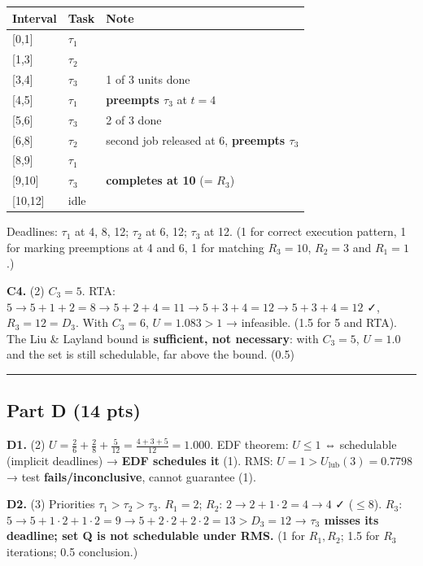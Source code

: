 \documentclass[
  11pt,
]{article}
\newcounter{none} %
\begin{document}
{\def\LTcaptype{none} %
\begin{longtable}[]{@{}lll@{}}
\toprule\noalign{}
Interval & Task & Note \\
\midrule\noalign{}
\endhead
\bottomrule\noalign{}
\endlastfoot
{[}0,1{]} & \(\tau_1\) & \\
{[}1,3{]} & \(\tau_2\) & \\
{[}3,4{]} & \(\tau_3\) & 1 of 3 units done \\
{[}4,5{]} & \(\tau_1\) & \textbf{preempts \(\tau_3\)} at \(t=4\) \\
{[}5,6{]} & \(\tau_3\) & 2 of 3 done \\
{[}6,8{]} & \(\tau_2\) & second job released at 6, \textbf{preempts
\(\tau_3\)} \\
{[}8,9{]} & \(\tau_1\) & \\
{[}9,10{]} & \(\tau_3\) & \textbf{completes at 10} (= \(R_3\)) \\
{[}10,12{]} & idle & \\
\end{longtable}
}

Deadlines: \(\tau_1\) at 4, 8, 12; \(\tau_2\) at 6, 12; \(\tau_3\) at
12. (1 for correct execution pattern, 1 for marking preemptions at 4 and
6, 1 for matching \(R_3 = 10\), \(R_2 = 3\) and \(R_1 = 1\).)

\textbf{C4.} (2) \(C_3 = 5\). RTA:
\(5 \to 5 + 1 + 2 = 8 \to 5 + 2 + 4 = 11 \to 5 + 3 + 4 = 12 \to 5 + 3 + 4 = 12\)
✓, \(R_3 = 12 = D_3\). With \(C_3 = 6\), \(U = 1.083 > 1\) → infeasible.
(1.5 for 5 and RTA). The Liu \& Layland bound is \textbf{sufficient, not
necessary}: with \(C_3 = 5\), \(U = 1.0\) and the set is still
schedulable, far above the bound. (0.5)

\begin{center}\rule{0.5\linewidth}{0.5pt}\end{center}

\subsection{Part D (14 pts)}\label{part-d-14-pts}

\textbf{D1.} (2)
\(U = \tfrac26 + \tfrac28 + \tfrac5{12} = \tfrac{4+3+5}{12} = 1.000\).
EDF theorem: \(U \le 1\) ⇔ schedulable (implicit deadlines) →
\textbf{EDF schedules it} (1). RMS:
\(U = 1 > U_{\text{lub}}(3) = 0.7798\) → test
\textbf{fails/inconclusive}, cannot guarantee (1).

\textbf{D2.} (3) Priorities \(\tau_1 > \tau_2 > \tau_3\). \(R_1 = 2\);
\(R_2\): \(2 \to 2 + 1\cdot2 = 4 \to 4\) ✓ (\(\le 8\)). \(R_3\):
\(5 \to 5 + 1\cdot2 + 1\cdot2 = 9 \to 5 + 2\cdot2 + 2\cdot2 = 13 > D_3 = 12\)
→ \textbf{\(\tau_3\) misses its deadline; set Q is not schedulable under
RMS.} (1 for \(R_1, R_2\); 1.5 for \(R_3\) iterations; 0.5 conclusion.)
\end{document}
